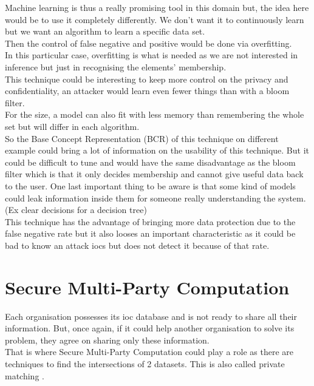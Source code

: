 \documentclass{eplmastersthesis}
\begin{document}
Machine learning is thus a really promising tool in this domain but, the idea here would be to use it completely differently. We don't want it to continuously learn but we want an algorithm to learn a specific data set.\\
Then the control of false negative and positive would be done via overfitting.\\
In this particular case, overfitting is what is needed as we are not interested in inference but just in recognising the elements' membership.\\

This technique could be interesting to keep more control on the privacy and confidentiality, an attacker would learn even fewer things than with a bloom filter.\\
For the size, a model can also fit with less memory than remembering the whole set but will differ in each algorithm.\\
So the Base Concept Representation (BCR) of this technique on different example could bring a lot of information on the usability of this technique. But it could be difficult to tune and would have the same disadvantage as the bloom filter which is that it only decides membership and cannot give useful data back to the user. One last important thing to be aware is that some kind of models could leak information inside them for someone really understanding the system. (Ex clear decisions for a decision tree)\\

This technique has the advantage of bringing more data protection due to the false negative rate but it also looses an important characteristic as it could be bad to know an attack \gls{ioc}s but does not detect it because of that rate.

\section{Secure Multi-Party Computation}
Each organisation possesses its \gls{ioc} database and is not ready to share all their information. But, once again, if it could help another organisation to solve its problem, they agree on sharing only these information.\\
That is where Secure Multi-Party Computation could play a role as there are techniques to find the intersections of 2 datasets. This is also called private matching \cite{agrawal2003information, li2005private}.\\
\end{document}
